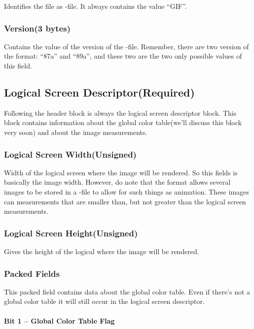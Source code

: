 \begin{refsection}
  Identifies the file as \gif-file. It always contains the
  value ``GIF''.

  \subsubsection{Version(3 bytes)}

  Contains the value of the version of the \gif-file. Remember, there
  are two version of the \gif format: ``87a'' and ``89a'', and these
  two are the two only possible values of this field.

  \subsection{Logical Screen Descriptor(Required)}

  Following the header block is always the logical screen descriptor
  block. This block contains information about the global color
  table(we'll discuss this block very soon) and about the image
  measurements.

  \subsubsection{Logical Screen Width(Unsigned)}

  Width of the logical screen where the image will be rendered. So
  this fields is basically the image width. However, do note that the
  \gif format allows several images to be stored in a \gif-file to
  allow for such things as animation. These images can measurements
  that are smaller than, but not greater than the logical screen
  measurements.

  \subsubsection{Logical Screen Height(Unsigned)}

  Gives the height of the logical where the image will be rendered.

  \subsubsection{Packed Fields}

  This packed field contains data about the global color table. Even
  if there's not a global color table it will still occur in the
  logical screen descriptor.

  \paragraph{Bit 1 --  Global Color Table Flag}


\end{refsection}
